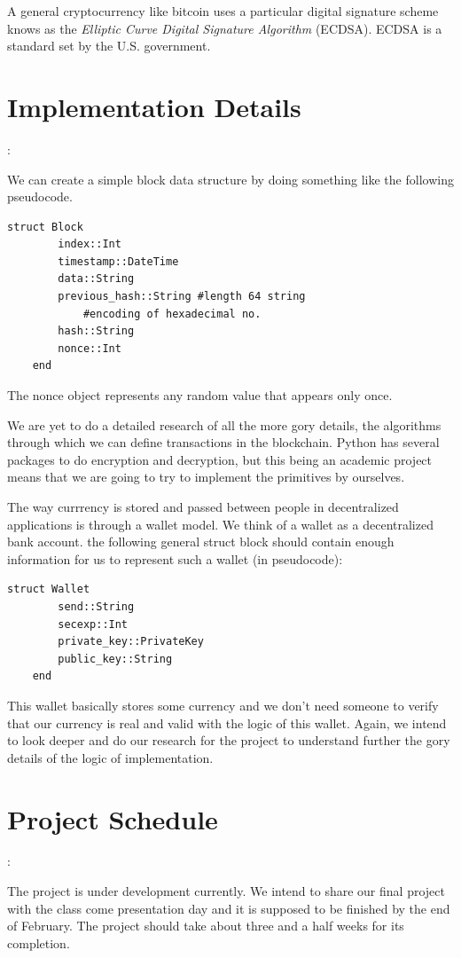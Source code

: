 \documentclass[a4paper, 12pt]{article}
\begin{document}
A general cryptocurrency like bitcoin uses a particular digital signature scheme knows as the \emph{
Elliptic Curve Digital Signature Algorithm} (ECDSA). ECDSA is a standard set by the U.S. government. 

\section{Implementation Details}: 

We can create a simple block data structure by doing something like the following pseudocode. 
\begin{lstlisting}[caption=How you could create a Block]
    struct Block 
        index::Int
        timestamp::DateTime
        data::String
        previous_hash::String #length 64 string
            #encoding of hexadecimal no.
        hash::String
        nonce::Int
    end 
\end{lstlisting}

The nonce object represents any random value that appears only once. 

We are yet to do a detailed research of all the more gory details, the algorithms through which we can define transactions in the blockchain. Python has several packages to do encryption and decryption, but this being an academic project means that we are going to try to implement the primitives by ourselves. 

The way currrency is stored and passed between people in decentralized applications is through a wallet model. We think of a wallet as a decentralized bank account. the following general struct block should contain enough information for us to represent such a wallet (in pseudocode):
\begin{lstlisting}[caption=A sufficient wallet structure]
    struct Wallet 
        send::String
        secexp::Int
        private_key::PrivateKey
        public_key::String
    end 
\end{lstlisting}

This wallet basically stores some currency and we don't need someone to verify that our currency is real and valid with the logic of this wallet. Again, we intend to look deeper and do our research for the project to understand further the gory details of the logic of implementation.  

\section{Project Schedule}: 

The project is under development currently.
We intend to share our final project with the class come presentation 
day and it is supposed to be finished by the end of February.
The project should take about three and a half weeks for its completion.
\end{document}

